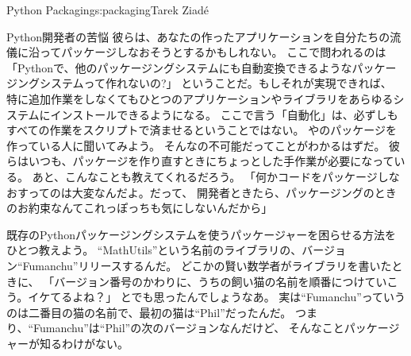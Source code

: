 \begin{aosachapter}{Python Packaging}{s:packaging}{Tarek Ziad\'{e}}
\begin{aosasect1}{Python開発者の苦悩}
彼らは、あなたの作ったアプリケーションを自分たちの流儀に沿ってパッケージしなおそうとするかもしれない。
ここで問われるのは
「Pythonで、他のパッケージングシステムにも自動変換できるようなパッケージングシステムって作れないの?」
ということだ。もしそれが実現できれば、
特に追加作業をしなくてもひとつのアプリケーションやライブラリをあらゆるシステムにインストールできるようになる。
ここで言う「自動化」は、必ずしもすべての作業をスクリプトで済ませるということではない。
やのパッケージを作っている人に聞いてみよう。
そんなの不可能だってことがわかるはずだ。
彼らはいつも、パッケージを作り直すときにちょっとした手作業が必要になっている。
あと、こんなことも教えてくれるだろう。
「何かコードをパッケージしなおすってのは大変なんだよ。だって、
開発者ときたら、パッケージングのときのお約束なんてこれっぽっちも気にしないんだから」

既存のPythonパッケージングシステムを使うパッケージャーを困らせる方法をひとつ教えよう。
``MathUtils''という名前のライブラリの、バージョン``Fumanchu''リリースするんだ。
どこかの賢い数学者がライブラリを書いたときに、
「バージョン番号のかわりに、うちの飼い猫の名前を順番につけていこう。イケてるよね？」
とでも思ったんでしょうなあ。
実は``Fumanchu''っていうのは二番目の猫の名前で、最初の猫は``Phil''だったんだ。
つまり、``Fumanchu''は``Phil''の次のバージョンなんだけど、
そんなことパッケージャーが知るわけがない。


\end{aosasect1}
\end{aosachapter}
